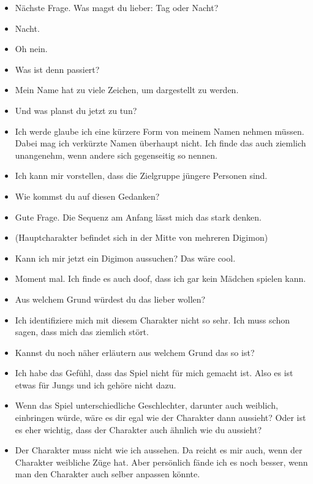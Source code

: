{\begin{itemize}[]
    \item {} \frq Nächste Frage. Was magst du lieber: Tag oder Nacht?\flq{} 
    \item {} Nacht.
    \item {} Oh nein.
    \item {} Was ist denn passiert?
    \item {} Mein Name hat zu viele Zeichen, um dargestellt zu werden.
    \item {} Und was planst du jetzt zu tun?
    \item {} Ich werde glaube ich eine kürzere Form von meinem Namen nehmen müssen. Dabei mag ich verkürzte Namen überhaupt nicht. Ich finde das auch ziemlich unangenehm, wenn andere sich gegenseitig so nennen.
    \item {} Ich kann mir vorstellen, dass die Zielgruppe jüngere Personen sind. 
    \item {} Wie kommst du auf diesen Gedanken?
    \item {} Gute Frage. Die Sequenz am Anfang lässt mich das stark denken.
    \item {} (Hauptcharakter befindet sich in der Mitte von mehreren Digimon)
    \item {} Kann ich mir jetzt ein Digimon aussuchen? Das wäre cool.
    \item {} Moment mal. Ich finde es auch doof, dass ich gar kein Mädchen spielen kann.
    \item {} Aus welchem Grund würdest du das lieber wollen?
    \item {} Ich identifiziere mich mit diesem Charakter nicht so sehr. Ich muss schon sagen, dass mich das ziemlich stört.
    \item {} Kannst du noch näher erläutern aus welchem Grund das so ist?
    \item {} Ich habe das Gefühl, dass das Spiel nicht für mich gemacht ist. Also es ist etwas für Jungs und ich gehöre nicht dazu.
    \item {} Wenn das Spiel unterschiedliche Geschlechter, darunter auch weiblich, einbringen würde, wäre es dir egal wie der Charakter dann aussieht? Oder ist es eher wichtig, dass der Charakter auch ähnlich wie du aussieht?
    \item {} Der Charakter muss nicht wie ich aussehen. Da reicht es mir auch, wenn der Charakter weibliche Züge hat. Aber persönlich fände ich es noch besser, wenn man den Charakter auch selber anpassen könnte. 

\end{itemize}}
